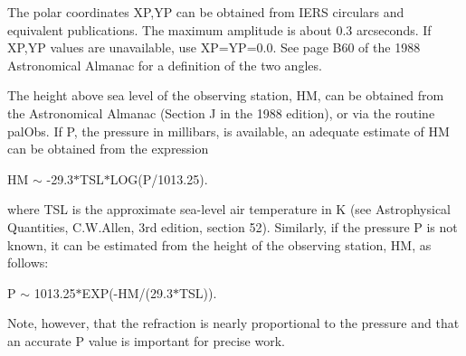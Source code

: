 \documentclass[twoside,11pt,nolof]{starlink}
\begin{document}
{{{         \sstitem
          The polar coordinates XP,YP can be obtained from IERS
           circulars and equivalent publications.  The maximum amplitude
           is about 0.3 arcseconds.  If XP,YP values are unavailable,
           use XP=YP=0.0.  See page B60 of the 1988 Astronomical Almanac
           for a definition of the two angles.

         \sstitem
          The height above sea level of the observing station, HM,
           can be obtained from the Astronomical Almanac (Section J
           in the 1988 edition), or via the routine palObs.  If P,
           the pressure in millibars, is available, an adequate
           estimate of HM can be obtained from the expression

      }
              HM $\sim$ -29.3$*$TSL$*$LOG(P/1013.25).

        where TSL is the approximate sea-level air temperature in K
        (see Astrophysical Quantities, C.W.Allen, 3rd edition,
        section 52).  Similarly, if the pressure P is not known,
        it can be estimated from the height of the observing
        station, HM, as follows:

              P $\sim$ 1013.25$*$EXP(-HM/(29.3$*$TSL)).

        Note, however, that the refraction is nearly proportional to the
        pressure and that an accurate P value is important for precise
        work.

   }
}
\end{document}
